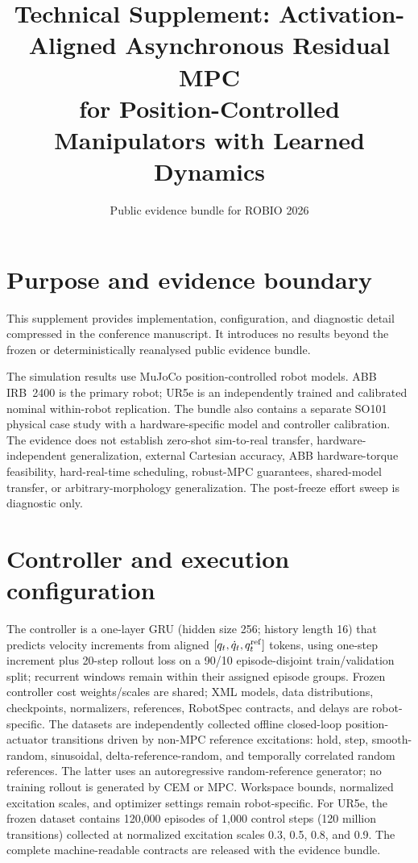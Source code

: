 \documentclass[10pt]{article}
\title{Technical Supplement: Activation-Aligned Asynchronous Residual MPC\\for Position-Controlled Manipulators with Learned Dynamics}
\author{Public evidence bundle for ROBIO 2026}
\begin{document}
\maketitle
\setlength{\textfloatsep}{8pt plus 2pt minus 2pt}
\setlength{\intextsep}{8pt plus 2pt minus 2pt}

\section{Purpose and evidence boundary}
This supplement provides implementation, configuration, and diagnostic detail
compressed in the conference manuscript. It introduces no results beyond the
frozen or deterministically reanalysed public evidence bundle.

The simulation results use MuJoCo position-controlled robot models. ABB
IRB~2400 is the primary robot; UR5e is an independently trained and calibrated
nominal within-robot replication. The bundle also contains a separate SO101
physical case study with a hardware-specific model and controller calibration.
The evidence does not establish zero-shot sim-to-real transfer,
hardware-independent generalization, external Cartesian accuracy, ABB
hardware-torque feasibility, hard-real-time scheduling, robust-MPC guarantees,
shared-model transfer, or arbitrary-morphology generalization. The post-freeze
effort sweep is diagnostic only.

\section{Controller and execution configuration}
The controller is a one-layer GRU (hidden size 256; history length 16) that
predicts velocity increments from aligned $[q_t,\dot q_t,q_t^{\rm ref}]$ tokens,
using one-step increment plus 20-step rollout loss on a 90/10 episode-disjoint
train/validation split; recurrent windows remain within their assigned episode
groups.
Frozen controller cost weights/scales are shared; XML models, data distributions,
checkpoints, normalizers, references, RobotSpec contracts, and delays are
robot-specific. The datasets are independently collected offline closed-loop
position-actuator transitions driven by non-MPC reference excitations: hold,
step, smooth-random, sinusoidal, delta-reference-random, and temporally
correlated random references. The latter uses an autoregressive random-reference
generator; no training rollout is generated by CEM or MPC. Workspace bounds,
normalized excitation scales, and optimizer settings remain robot-specific. For UR5e, the frozen dataset contains 120,000
episodes of 1,000 control steps (120 million transitions) collected at
normalized excitation scales 0.3, 0.5, 0.8, and 0.9. The complete
machine-readable contracts are released with the evidence bundle.
\end{document}
